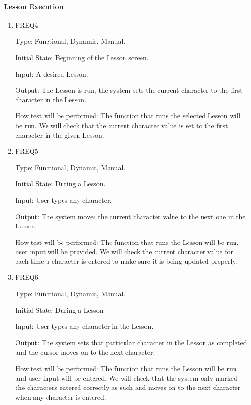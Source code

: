 \documentclass[12pt, titlepage]{article}
\begin{document}
\paragraph{Lesson Execution}
\begin{enumerate}
    					
\item{FREQ4\\}

Type: Functional, Dynamic, Manual.
					
Initial State: Beginning of the Lesson screen.
					
Input: A desired Lesson.
					
Output: The Lesson is run, the system sets the current character to the first character in the Lesson.
					
How test will be performed: The function that runs the selected Lesson will be run. We will check that the current character value is set to the first character in the given Lesson.

					
\item{FREQ5\\}

Type: Functional, Dynamic, Manual.
					
Initial State: During a Lesson.
					
Input: User types any character.
					
Output: The system moves the current character value to the next one in the Lesson.
					
How test will be performed: The function that runs the Lesson will be run, user input will be provided. We will check the current character value for each time a character is entered to make sure it is being updated properly.

					
\item{FREQ6\\}

Type: Functional, Dynamic, Manual.
					
Initial State: During a Lesson
					
Input: User types any character in the Lesson.
					
Output: The system sets that particular character in the Lesson as completed and the cursor moves on to the next character.
					
How test will be performed: The function that runs the Lesson will be run and user input will be entered. We will check that the system only marked the characters entered correctly as such and moves on to the next character when any character is entered.


\end{enumerate}
\end{document}
